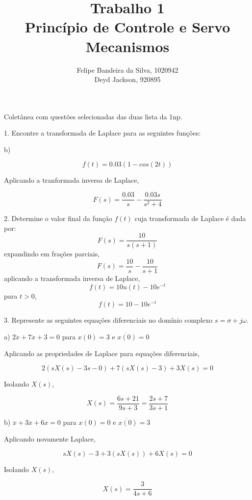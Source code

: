 \documentclass[paper=a4, fontsize=11pt]{article}
\title{Trabalho 1\\Princípio de Controle e Servo Mecanismos}
\author{Felipe Bandeira da Silva, 1020942\\Deyd Jackson, 920895}
\begin{document}
\maketitle

Coletânea com questões selecionadas das duas lista da 1np.



\newpage

1. Encontre a transformada de Laplace para as seguintes funções:

b) 

$$
f(t) = 0.03(1 - cos(2t))
$$

Aplicando a tranformada inversa de Laplace,

$$
F(s) = \frac{0.03}{s} - \frac{0.03 s}{s^2+4}
$$

\newpage

2. Determine o valor final da função $f(t)$ cuja transformada de Laplace é dada por:
$$
F(s) = \frac{10}{s(s+1)}
$$
expandindo em frações parciais,
$$
F(s) = \frac{10}{s} - \frac{10}{s+1}
$$
aplicando a transformada inversa de Laplace,
$$
f(t) = 10 u(t) - 10 e^{-t}
$$
para $t>0$,
$$
f(t) = 10 - 10 e^{-t}
$$

\newpage

3. Represente as seguintes equações diferenciais no domínio complexo $s=\sigma + j \omega$.

a) $2 \ddot{x} + 7 \dot{x} +  3 = 0$ para $x(0)=3$ e $\dot{x(0)}=0$

Aplicando as propriedades de Laplace para equações diferenciais,

$$
2 (s X(s) - 3 s - 0) + 7 (s X(s) - 3) + 3 X(s) = 0
$$

Isolando $X(s)$,

$$
X(s) = \frac{6s + 21}{9 s + 3} = \frac{2 s + 7}{3 s + 1}
$$

b) $\ddot{x} + 3 \ddot{x} + 6 x = 0$ para $x(0) = 0$ e $\dot{x(0)}=3$

Aplicando novamente Laplace,

$$
s X(s) - 3 + 3 (s X(s)) + 6 X(s) = 0
$$

Isolando $X(s)$,

$$
X(s) = \frac{3}{4 s + 6}
$$
\end{document}
